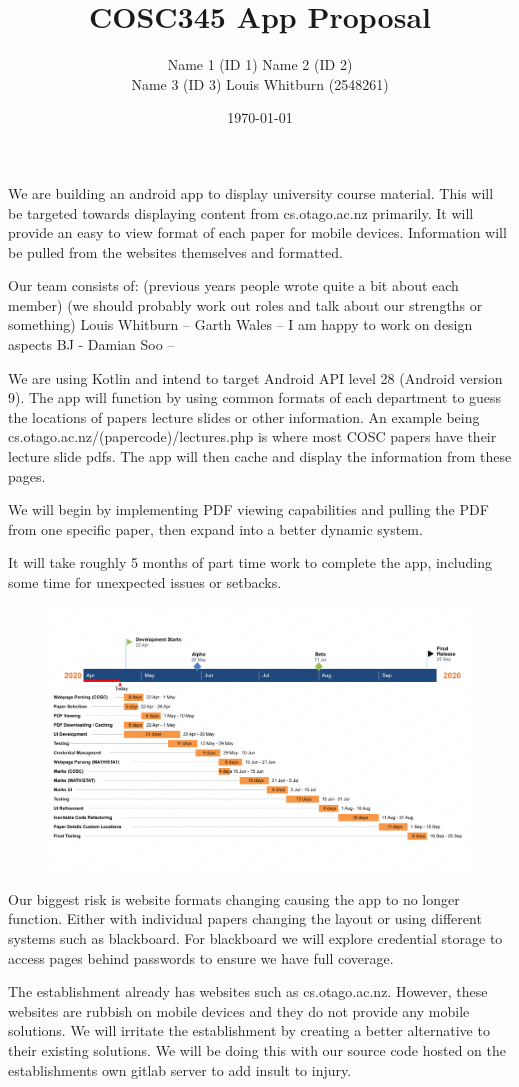 \documentclass{article}
\title{COSC345 App Proposal}
\author{Name 1 (ID 1) Name 2 (ID 2) \\ Name 3 (ID 3) Louis Whitburn (2548261)}
\date{\today}
\begin{document}
	\maketitle
	
	We are building an android app to display university course material. This will be targeted towards displaying content from cs.otago.ac.nz primarily. It will provide an easy to view format of each paper for mobile devices. Information will be pulled from the websites themselves and formatted.
	
	Our team consists of: (previous years people wrote quite a bit about each member)
	(we should probably work out roles and talk about our strengths or something)
	Louis Whitburn – 
	Garth Wales – I am happy to work on design aspects
	BJ - 
	Damian Soo – 

	We are using Kotlin and intend to target Android API level 28 (Android version 9). The app will function by using common formats of each department to guess the locations of papers lecture slides or other information. An example being cs.otago.ac.nz/(papercode)/lectures.php is where most COSC papers have their lecture slide pdfs. The app will then cache and display the information from these pages.

	We will begin by implementing PDF viewing capabilities and pulling the PDF from one specific paper, then expand into a better dynamic system. 

	It will take roughly 5 months of part time work to complete the app, including some time for unexpected issues or setbacks.
	
	\begin{figure}[h!]
		\centering
		\includegraphics[width=\linewidth]{chart.png}
	\end{figure}
	
	Our biggest risk is website formats changing causing the app to no longer function. Either with individual papers changing the layout or using different systems such as blackboard. For blackboard we will explore credential storage to access pages behind passwords to ensure we have full coverage.
	
	The establishment already has websites such as cs.otago.ac.nz. However, these websites are rubbish on mobile devices and they do not provide any mobile solutions. We will irritate the establishment by creating a better alternative to their existing solutions. We will be doing this with our source code hosted on the establishments own gitlab server to add insult to injury.
\end{document}
